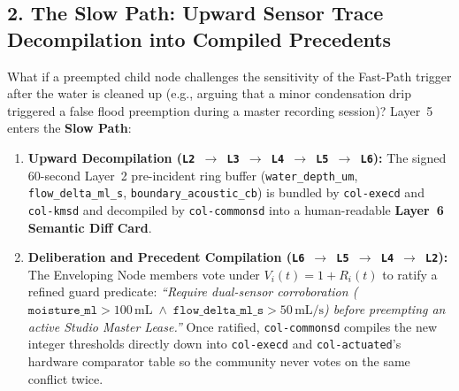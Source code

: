 \subsection{2. The Slow Path: Upward Sensor Trace Decompilation into Compiled Precedents}

What if a preempted child node challenges the sensitivity of the Fast-Path trigger after the water is cleaned up (e.g., arguing that a minor condensation drip triggered a false flood preemption during a master recording session)? Layer~5 enters the \textbf{Slow Path}:
\begin{enumerate}
    \item \textbf{Upward Decompilation (\texttt{L2 $\to$ L3 $\to$ L4 $\to$ L5 $\to$ L6}):} The signed 60-second Layer~2 pre-incident ring buffer (\texttt{water\_depth\_um}, \texttt{flow\_delta\_ml\_s}, \texttt{boundary\_acoustic\_cb}) is bundled by \texttt{col-execd} and \texttt{col-kmsd} and decompiled by \texttt{col-commonsd} into a human-readable \textbf{Layer~6 Semantic Diff Card}.
    \item \textbf{Deliberation and Precedent Compilation (\texttt{L6 $\to$ L5 $\to$ L4 $\to$ L2}):} The Enveloping Node members vote under $V_i(t) = 1 + R_i(t)$ to ratify a refined guard predicate: \textit{``Require dual-sensor corroboration ($\mathtt{moisture\_ml} > 100\,\mathrm{mL} \;\land\; \mathtt{flow\_delta\_ml\_s} > 50\,\mathrm{mL/s}$) before preempting an active Studio Master Lease.''} Once ratified, \texttt{col-commonsd} compiles the new integer thresholds directly down into \texttt{col-execd} and \texttt{col-actuated}'s hardware comparator table so the community never votes on the same conflict twice.
\end{enumerate}

